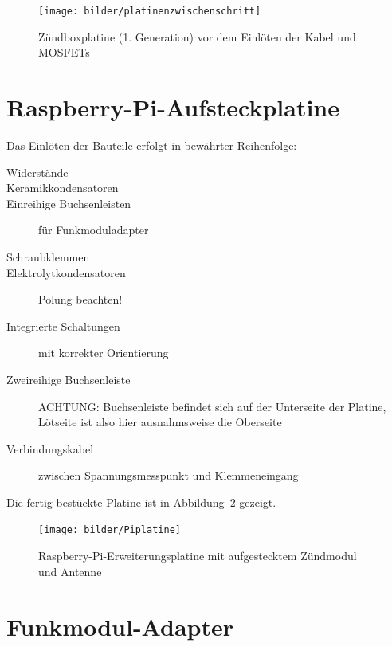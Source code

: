 \documentclass[paper=a4, parskip, numbers=noenddot, toc=listof, headsepline]{scrbook}
\begin{document}
				\begin{figure}
					\centering
					\texttt{[image: bilder/platinenzwischenschritt]}
					\caption{Zündboxplatine (1. Generation) vor dem Einlöten der Kabel und MOSFETs}
					\label{fig:platinenzwischenschritt}
				\end{figure}

		\section{Raspberry-Pi-Aufsteckplatine}
			\label{sec:raspipcb}

			Das Einlöten der Bauteile erfolgt in bewährter Reihenfolge:
			\begin{description}
				\item[Widerstände]
				\item[Keramikkondensatoren]
				\item[Einreihige Buchsenleisten] für Funkmoduladapter
				\item[Schraubklemmen]
				\item[Elektrolytkondensatoren] Polung beachten!
				\item[Integrierte Schaltungen] mit korrekter Orientierung
				\item[Zweireihige Buchsenleiste] ACHTUNG: Buchsenleiste befindet sich auf der Unterseite der Platine, Lötseite ist also hier ausnahmsweise die Oberseite
				\item[Verbindungskabel] zwischen Spannungsmesspunkt und Klemmeneingang
			\end{description}

			Die fertig bestückte Platine ist in Abbildung~\ref{fig:raspiextension} gezeigt.

			\begin{figure}
				\centering
				\texttt{[image: bilder/Piplatine]}
				\caption{Raspberry-Pi-Erweiterungsplatine mit aufgestecktem Zündmodul und Antenne}
				\label{fig:raspiextension}
			\end{figure}

		\section{Funkmodul-Adapter}
\end{document}
